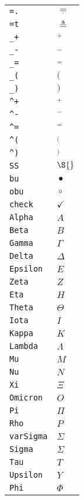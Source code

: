 \begin{longtable}{ll}
\texttt{=.}&${}\mathrel{\underset{\cdotp}{=}} {}$\\
\texttt{=t}&${}\triangleq {}$\\
\texttt{\_+}&${}_+ {}$\\
\texttt{\_{-}}&${}_- {}$\\
\texttt{\_=}&${}_= {}$\\
\texttt{\_(}&${}( {}$\\
\texttt{\_)}&${}) {}$\\
\texttt{\textasciicircum +}&${}^+ {}$\\
\texttt{\textasciicircum {-}}&${}^- {}$\\
\texttt{\textasciicircum =}&${}^= {}$\\
\texttt{\textasciicircum (}&${}^( {}$\\
\texttt{\textasciicircum )}&${}^) {}$\\
\texttt{SS}&${}\S {}$\\
\texttt{bu}&${}\bullet {}$\\
\texttt{obu}&${}\circ {}$\\
\texttt{check}&${}\checkmark {}$\\
\texttt{Alpha}&${}A {}$\\
\texttt{Beta}&${}B {}$\\
\texttt{Gamma}&${}\Gamma {}$\\
\texttt{Delta}&${}\Delta {}$\\
\texttt{Epsilon}&${}E {}$\\
\texttt{Zeta}&${}Z {}$\\
\texttt{Eta}&${}H {}$\\
\texttt{Theta}&${}\Theta {}$\\
\texttt{Iota}&${}I {}$\\
\texttt{Kappa}&${}K {}$\\
\texttt{Lambda}&${}\Lambda {}$\\
\texttt{Mu}&${}M {}$\\
\texttt{Nu}&${}N {}$\\
\texttt{Xi}&${}\Xi {}$\\
\texttt{Omicron}&${}O {}$\\
\texttt{Pi}&${}\Pi {}$\\
\texttt{Rho}&${}P {}$\\
\texttt{varSigma}&${}\varSigma {}$\\
\texttt{Sigma}&${}\Sigma {}$\\
\texttt{Tau}&${}T {}$\\
\texttt{Upsilon}&${}Y {}$\\
\texttt{Phi}&${}\Phi {}$\\

\end{longtable}
